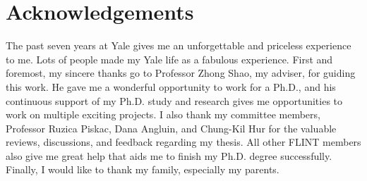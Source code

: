 \chapter{Acknowledgements} %
\thispagestyle{empty}

The past seven years at Yale gives me an unforgettable and priceless experience to me. Lots of people made my Yale life as a fabulous experience. 
First and foremost, my sincere thanks go to  Professor Zhong Shao, my adviser,  for guiding this work. 
He gave me a wonderful opportunity to work for a Ph.D., and his continuous support of my Ph.D. study and research gives me opportunities to work on multiple exciting projects. 
I also thank my committee members, Professor Ruzica Piskac, Dana Angluin, and Chung-Kil Hur for the valuable reviews, discussions, and feedback regarding my thesis. All other FLINT members also give me great help that aids me to finish my Ph.D. degree successfully. 
Finally, I would like to thank my family, especially my parents.



\clearpage
